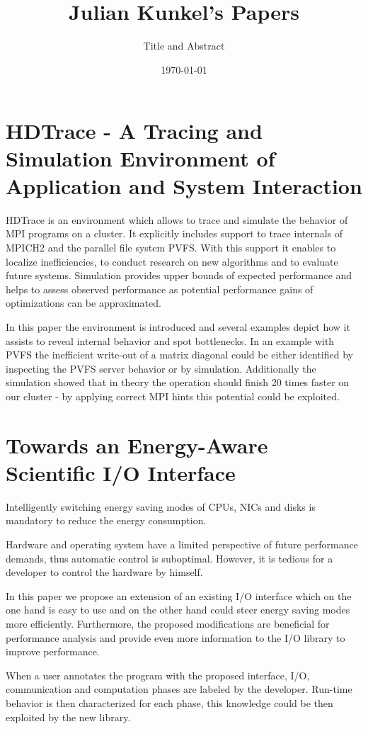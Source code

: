 \documentclass[11pt]{article}
\title{\espaco\\[3cm] \huge Julian Kunkel's Papers\\[5cm]}
\author{\LARGE Title and Abstract\\[3cm]}
\date{\today}
\begin{document}
\maketitle

\clearpage

\section{HDTrace - A Tracing and Simulation Environment of Application and System Interaction}

HDTrace is an environment which allows to
trace and simulate the behavior of MPI programs on a
cluster. It explicitly includes support to trace internals
of MPICH2 and the parallel file system PVFS. With
this support it enables to localize inefficiencies, to conduct research on new algorithms and to evaluate future
systems. Simulation provides upper bounds of expected
performance and helps to assess observed performance
as potential performance gains of optimizations can be
approximated.

In this paper the environment is introduced and
several examples depict how it assists to reveal internal behavior and spot bottlenecks. In an example with
PVFS the inefficient write-out of a matrix diagonal
could be either identified by inspecting the PVFS server
behavior or by simulation. Additionally the simulation
showed that in theory the operation should finish 20
times faster on our cluster - by applying correct MPI
hints this potential could be exploited.

\clearpage

\section{Towards an Energy-Aware Scientific I/O Interface}

Intelligently switching energy saving modes
of CPUs, NICs and disks is mandatory to reduce the
energy consumption. 

Hardware and operating system have a limited perspective of future performance demands, thus automatic
control is suboptimal. However, it is tedious for a developer to control the hardware by himself.

In this paper we propose an extension of an existing I/O interface which on the one hand is easy to use
and on the other hand could steer energy saving modes
more efficiently. Furthermore, the proposed modifications are beneficial for performance analysis and provide even more information to the I/O library to improve performance.

When a user annotates the program with the proposed interface, I/O, communication and computation
phases are labeled by the developer. Run-time behavior is then characterized for each phase, this knowledge
could be then exploited by the new library.

\clearpage
\end{document}
